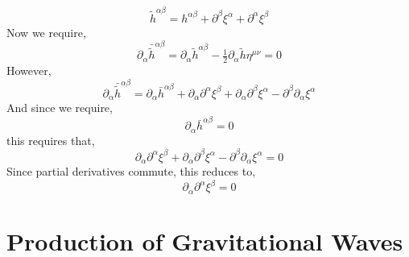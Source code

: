 \documentclass[11pt, a4paper]{article}
\begin{document}
\[ \tilde{h}^{\alpha \beta} = h^{\alpha \beta} + \partial^\beta \xi^\alpha + \partial^\alpha \xi^\beta \]
Now we require,
\[ \partial_\alpha \bar{\tilde{h}}^{\alpha \beta} = \partial_\alpha \tilde{h}^{\alpha \beta} - \tfrac{1}{2} \partial_\alpha \tilde{h} \eta^{\mu \nu} = 0 \]
However,
\[ \partial_\alpha \bar{\tilde{h}}^{\alpha \beta} = \partial_\alpha \bar{h}^{\alpha \beta} + \partial_\alpha \partial^\alpha \xi^\beta + \partial_\alpha \partial^\beta \xi^\alpha -  \partial^\beta \partial_\alpha \xi^\alpha \]
And since we require,
\[ \partial_\alpha \bar{h}^{\alpha \beta} = 0 \]
this requires that,
\[ \partial_\alpha \partial^\alpha \xi^\beta + \partial_\alpha \partial^\beta \xi^\alpha -  \partial^\beta \partial_\alpha \xi^\alpha = 0 \]
Since partial derivatives commute, this reduces to,
\[ \partial_\alpha \partial^\alpha \xi^\beta = 0 \]

\section{Production of Gravitational Waves}
\end{document}
